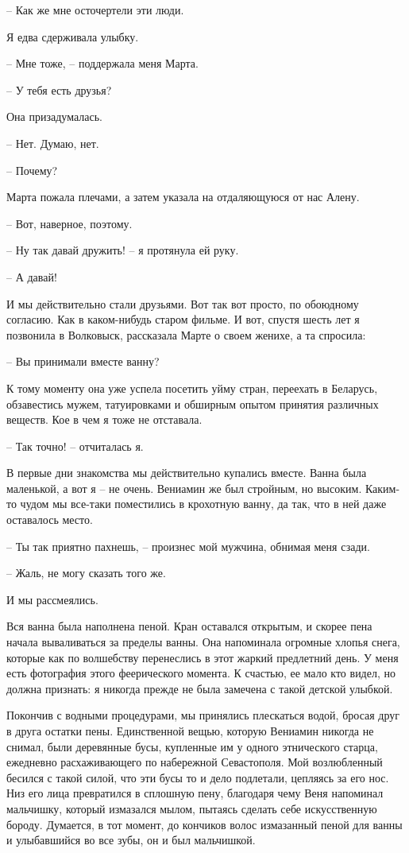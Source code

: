 \documentclass[
]{book}
\begin{document}
-- Как же мне осточертели эти люди.

Я едва сдерживала улыбку.

-- Мне тоже, -- поддержала меня Марта.

-- У тебя есть друзья?

Она призадумалась.

-- Нет. Думаю, нет.

-- Почему?

Марта пожала плечами, а затем указала на отдаляющуюся от нас Алену.

-- Вот, наверное, поэтому.

-- Ну так давай дружить! -- я протянула ей руку.

-- А давай!

И мы действительно стали друзьями. Вот так вот просто, по обоюдному согласию. Как в каком-нибудь старом фильме. И вот, спустя шесть лет я позвонила в Волковыск, рассказала Марте о своем женихе, а та спросила:

-- Вы принимали вместе ванну?

К тому моменту она уже успела посетить уйму стран, переехать в Беларусь, обзавестись мужем, татуировками и обширным опытом принятия различных веществ. Кое в чем я тоже не отставала.

-- Так точно! -- отчиталась я.

В первые дни знакомства мы действительно купались вместе. Ванна была маленькой, а вот я -- не очень. Вениамин же был стройным, но высоким. Каким-то чудом мы все-таки поместились в крохотную ванну, да так, что в ней даже оставалось место.

-- Ты так приятно пахнешь, -- произнес мой мужчина, обнимая меня сзади.

-- Жаль, не могу сказать того же.

И мы рассмеялись.

Вся ванна была наполнена пеной. Кран оставался открытым, и скорее пена начала вываливаться за пределы ванны. Она напоминала огромные хлопья снега, которые как по волшебству перенеслись в этот жаркий предлетний день. У меня есть фотография этого феерического момента. К счастью, ее мало кто видел, но должна признать: я никогда прежде не была замечена с такой детской улыбкой.

Покончив с водными процедурами, мы принялись плескаться водой, бросая друг в друга остатки пены. Единственной вещью, которую Вениамин никогда не снимал, были деревянные бусы, купленные им у одного этнического старца, ежедневно расхаживающего по набережной Севастополя. Мой возлюбленный бесился с такой силой, что эти бусы то и дело подлетали, цепляясь за его нос. Низ его лица превратился в сплошную пену, благодаря чему Веня напоминал мальчишку, который измазался мылом, пытаясь сделать себе искусственную бороду. Думается, в тот момент, до кончиков волос измазанный пеной для ванны и улыбавшийся во все зубы, он и был мальчишкой.
\end{document}
